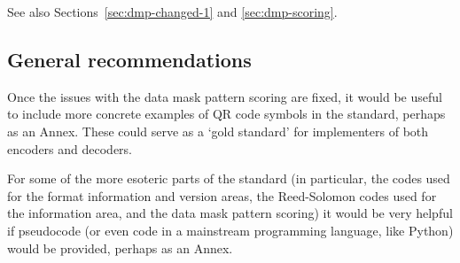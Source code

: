 \documentclass[a4paper,twoside]{article}
\begin{document}
See also Sections~\ref{sec:dmp-changed-1} and \ref{sec:dmp-scoring}.

\subsection{General recommendations}

Once the issues with the data mask pattern scoring are fixed, it would be useful to include more concrete examples
of QR code symbols in the standard, perhaps as an Annex. These could serve as a `gold standard' for implementers of both
encoders and decoders.

For some of the more esoteric parts of the standard (in particular, the codes used for the format information and version areas,
the Reed-Solomon codes used for the information area, and the data mask pattern scoring) it would be very helpful if pseudocode
(or even code in a mainstream programming language, like Python) would be provided, perhaps as an Annex.
\end{document}

